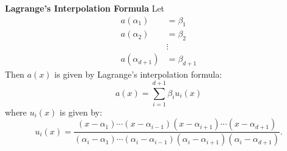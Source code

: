 \textbf{Lagrange's Interpolation Formula} Let 
\begin{align*}
a(\alpha_1) &= \beta_1\\
a(\alpha_2) &= \beta_2\\
&\vdots\\
a(\alpha_{d+1}) &= \beta_{d+1}
\end{align*}
Then $a(x)$ is given by Lagrange's interpolation formula:
\[
a(x) = \sum_{i=1}^{d+1} \beta_i u_i(x)
\]
where $u_i(x)$ is given by:
\[
u_i(x) = \frac{(x-\alpha_1)\cdots (x-\alpha_{i-1})(x-\alpha_{i+1})\cdots
(x-\alpha_{d+1})}{(\alpha_i -
\alpha_1)\cdots(\alpha_i-\alpha_{i-1})(\alpha_i-\alpha_{i+1})(\alpha_i-\alpha_{d+1})}.
\]

\begin{comment}
Hence, in $u_i(x)$, the factors, $(x-\alpha_i)$ in the
numerator, and the factor $(\alpha_i-\alpha_i)$ (which would be 0) in the
nominator, are left out.

Note that for $u_i(x)$ to be well-defined, all constant terms $\alpha_i -
\alpha_j$ in the denominator must be invertible. This is guaranteed if $F$ is a
field since $\alpha_i - \alpha_j\neq 0$ for $i\neq j$. Note also that the
denominator is simply a constant and hence $u_i(x)$ is indeed a polynomial of
degree $d$. It eas easy to verify that $u_i(\alpha_i)=1$ and $u_i(\alpha_j)=0$
for $j\neq i$. Thus the polynomials $a(x)$ and $\sum_{i=1}^{d+1}\beta_i u_i(x)$
agree when evaluated at any $\alpha_i$. Note that $a(x)$ has degree at most $d$.

It remains to prove the uniqueness. Suppose there is another polynomial $a'(x)$
of degree at most $d$ such that $\beta_i=a'(\alpha_i)$ for $i=1,\ldots,d+1$.
Then $a(x)-a'(x)$ is also a polynomial of degree at most $d$, which (according
to Theorem 7.31) can have at most $d$ roots, unless it is 0. But $a(x)-a'(x)$
has indeed the $d+1$ roots $\alpha_1,\ldots,\alpha_{d+1}$. Thus it must be 0,
which implies $\alpha(x) = \alpha'(x)$.
\end{comment}


